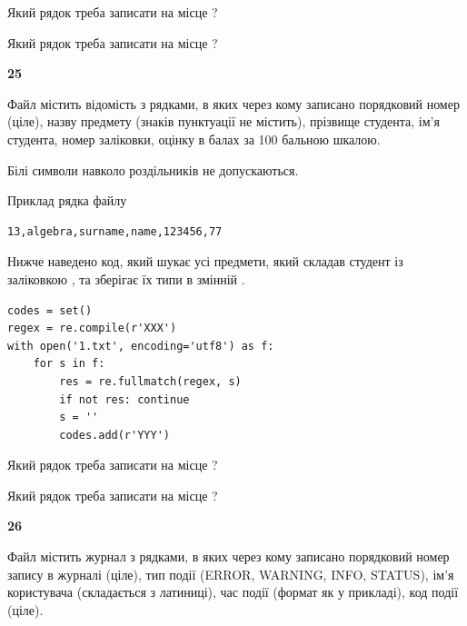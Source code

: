 Який рядок треба записати на місце  ?\par
\vspace{5mm}


Який рядок треба записати на місце  ?\par


\newpage

{\begin {center}\textbf{ 25}\end {center}}\par
Файл  містить відомість з рядками, в яких через кому записано поряд\-ковий номер (ціле), назву предмету (знаків пунктуації не містить), прізвище студента, ім'я студента, номер заліковки, оцінку в балах за 100 бальною шкалою.

Білі символи навколо роздільників не допускаються.

Приклад рядка файлу



\begin{verbatim}
13,algebra,surname,name,123456,77
\end{verbatim}


Нижче наведено код, який шукає усі предмети, який складав студент із заліковкою , та зберігає їх типи в змінній .



\begin{verbatim}
codes = set()
regex = re.compile(r'XXX')
with open('1.txt', encoding='utf8') as f:
    for s in f:
        res = re.fullmatch(regex, s)
        if not res: continue
        s = ''
        codes.add(r'YYY')
\end{verbatim}





Який рядок треба записати на місце  ?\par
\vspace{5mm}


Який рядок треба записати на місце  ?\par


\newpage

{\begin {center}\textbf{ 26}\end {center}}\par
Файл  містить журнал з рядками, в яких через кому записано поряд\-ко\-вий номер запису в журналі (ціле), тип події (ERROR, WARNING, INFO, STATUS), ім'я користувача (складається з латиниці), час події (фор\-мат як у прикладі), код події (ціле).

